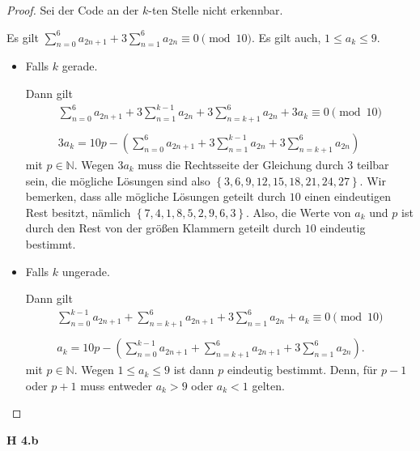\documentclass[12pt]{extarticle}
\begin{document}
\begin{proof}
  Sei der Code an der \(k\)-ten Stelle nicht erkennbar.

  Es gilt $\sum_{n=0}^6{a_{2n+1}}+3\sum_{n=1}^6{a_{2n}} \equiv 0
  \pmod{10}$.  Es gilt auch, \(1 \leq a_k \leq 9\).

\vspace{4mm}
  \begin{itemize}
  \item Falls \(k\) gerade.

    Dann gilt
\begin{align*}
    \sum_{n=0}^6{a_{2n+1}}+3\sum_{n=1}^{k-1}{a_{2n}}+3\sum_{n=k+1}^{6}{a_{2n}}+3a_k
  \equiv 0 \pmod{10}\\\\
  3a_k=10p-\left( \sum_{n=0}^6{a_{2n+1}}+3\sum_{n=1}^{k-1}{a_{2n}}+3\sum_{n=k+1}^{6}{a_{2n}} \right)
\end{align*}
mit \(p \in \mathbb{N}\).  Wegen \(3a_k\) muss die Rechtsseite der
Gleichung durch \(3\) teilbar sein, die mögliche Lösungen sind also
\(\left\{ 3, 6, 9, 12, 15, 18, 21, 24, 27 \right\}\).  Wir bemerken,
dass alle mögliche Lösungen geteilt durch \(10\) einen eindeutigen Rest
besitzt, nämlich \(\left\{ 7, 4, 1, 8, 5, 2, 9, 6, 3 \right\}\).  Also,
die Werte von \(a_k\) und \(p\) ist durch den Rest von der größen Klammern
geteilt durch \(10\) eindeutig bestimmt.

  \item Falls \(k\) ungerade.

    Dann gilt
\begin{align*}
\sum_{n=0}^{k-1}{a_{2n+1}}+\sum_{n=k+1}^6{a_{2n+1}}+3\sum_{n=1}^6{a_{2n}}+a_k
  \equiv 0  \pmod{10}\\\\
  a_k=10p-\left( \sum_{n=0}^{k-1}{a_{2n+1}}+\sum_{n=k+1}^6{a_{2n+1}}+3\sum_{n=1}^6{a_{2n}} \right).
\end{align*}
mit \(p \in \mathbb{N}\).  Wegen \(1 \leq a_k \leq 9\) ist dann \(p\)
eindeutig bestimmt.  Denn, für \(p-1\) oder \(p+1\) muss entweder $a_k >
9$ oder \(a_k<1\) gelten.

  \end{itemize}
\end{proof}

\vspace{4mm}

\newpage

\textbf{H 4.b}
\end{document}
